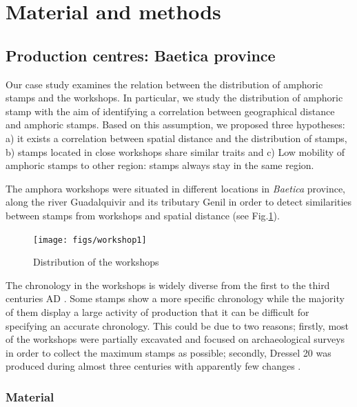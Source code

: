 \documentclass[review]{elsarticle}
\begin{document}


\section{Material and methods}

\subsection{Production centres: Baetica province}

Our case study examines the relation between the distribution of amphoric stamps and the workshops. In particular, we study the distribution of amphoric stamp with the aim of identifying a correlation between geographical distance and amphoric stamps. Based on this assumption, we proposed three hypotheses: a) it exists a correlation between spatial distance and the distribution of stamps, b) stamps located in close workshops share similar traits and c) Low mobility of amphoric stamps to other region: stamps always stay in the same region.  

The amphora workshops were situated in different locations in \textit{Baetica} province, along the river Guadalquivir and its tributary Genil in order to detect similarities between stamps from workshops and spatial distance (see Fig.\ref{workshop}).

\begin{figure}[htp]
	\centering
\texttt{[image: figs/workshop1]}
\caption{Distribution of the workshops}
\label{workshop}
\end{figure} 


The chronology in the workshops is widely diverse from the first to the third centuries AD \citep{millet_anforas_1998,rodriguez_baetican_1998,chic2005comercio}. Some stamps show a more specific chronology while the majority of them display a large activity of production that it can be difficult for specifying an accurate chronology. This could be due to two reasons; firstly, most of the workshops were partially excavated and focused on archaeological surveys in order to collect the maximum stamps as possible; secondly, Dressel 20 was produced during almost three centuries with apparently few changes \citep{berni_piero_chapter_2017}.

\subsubsection{Material}
 
\end{document}
